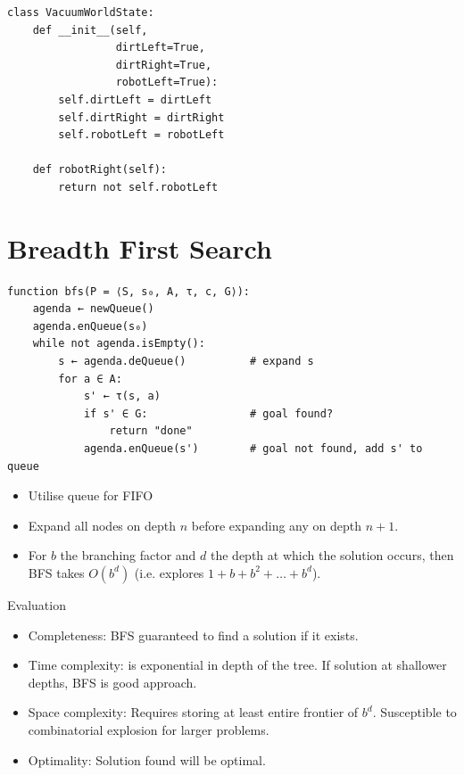 \documentclass[12pt, a4paper]{article}
\begin{document}
\begin{lstlisting}[]
class VacuumWorldState:
    def __init__(self, 
                 dirtLeft=True, 
                 dirtRight=True, 
                 robotLeft=True):
        self.dirtLeft = dirtLeft
        self.dirtRight = dirtRight
        self.robotLeft = robotLeft

    def robotRight(self):
        return not self.robotLeft
\end{lstlisting}

\section{Breadth First Search}
\begin{algorithm}[H]
\end{algorithm}
\begin{Verbatim}
function bfs(P = ⟨S, s₀, A, τ, c, G⟩):
    agenda ← newQueue()
    agenda.enQueue(s₀)
    while not agenda.isEmpty():
        s ← agenda.deQueue()          # expand s
        for a ∈ A:
            s' ← τ(s, a)
            if s' ∈ G:                # goal found?
                return "done"
            agenda.enQueue(s')        # goal not found, add s' to queue
\end{Verbatim}

\begin{itemize}
    \item Utilise queue for FIFO
    \item Expand all nodes on depth $n$ before expanding any on depth $n+1$.
    \item For $b$ the branching factor and $d$ the depth at which the solution occurs,
    then BFS takes $O(b^d)$ (i.e. explores $1 + b + b^2 +\ldots + b^d$).
\end{itemize}

\noindent Evaluation
\begin{itemize}
    \item Completeness: BFS guaranteed to find a solution if it exists.
    \item Time complexity: is exponential in depth of the tree. If solution at shallower depths, BFS is good approach.
    \item Space complexity: Requires storing at least entire frontier of $b^d$. Susceptible to combinatorial explosion for larger problems.
    \item Optimality: Solution found will be optimal.
\end{itemize}
\end{document}
